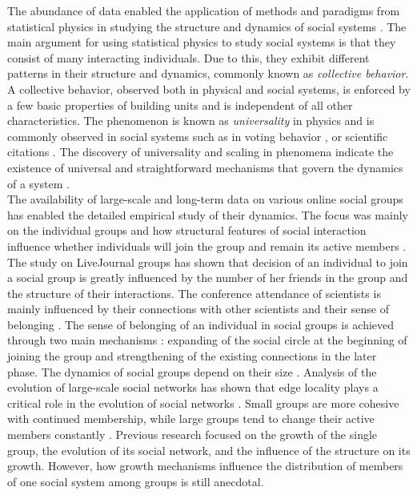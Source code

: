 The abundance of data enabled the application of methods and paradigms from statistical physics in studying the structure and dynamics of social systems \cite{castellano2009statistical}. The main argument for using statistical physics to study social systems is that they consist of many interacting individuals. Due to this, they exhibit different patterns in their structure and dynamics, commonly known as \textit{collective behavior}. A collective behavior, observed both in physical and social systems, is enforced by a few basic properties of building units and is independent of all other characteristics. The phenomenon is known as \textit{universality} in physics and is commonly observed in social systems such as in voting behavior \cite{chatterjee2013universality}, or scientific citations \cite{radicchi2008universality}. The discovery of universality and scaling in phenomena indicate the existence of universal and straightforward mechanisms that govern the dynamics of a system \cite{}.\\  


The availability of large-scale and long-term data on various online social groups has enabled the detailed empirical study of their dynamics. The focus was mainly on the individual groups and how structural features of social interaction influence whether individuals will join the group \cite{backstrom2006group} and remain its active members \cite{smiljanic2016theoretical, smiljanic2017associative}. The study on LiveJournal \cite{backstrom2006group} groups has shown that decision of an individual to join a social group is greatly influenced by the number of her friends in the group and the structure of their interactions. The conference attendance of scientists is mainly influenced by their connections with other scientists and their sense of belonging \cite{smiljanic2016theoretical}. The sense of belonging of an individual in social groups is achieved through two main mechanisms \cite{smiljanic2017associative}: expanding of the social circle at the beginning of joining the group and strengthening of the existing connections in the later phase. The dynamics of social groups depend on their size \cite{}. Analysis of the evolution of large-scale social networks has shown that edge locality plays a critical role in the evolution of social networks \cite{leskovec2008microscopic}. Small groups are more cohesive with continued membership, while large groups tend to change their active members constantly \cite{PNAS}. Previous research focused on the growth of the single group, the evolution of its social network, and the influence of the structure on its growth. However, how growth mechanisms influence the distribution of members of one social system among groups is still anecdotal.\\

